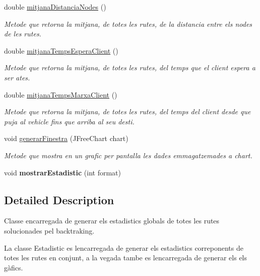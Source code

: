 \begin{DoxyCompactItemize}
double \hyperlink{class_portam_a_pro_p_1_1_estadistics_a81b7957cb875a5e8ac80d2d94c330bde}{mitjana\+Distancia\+Nodes} ()
\begin{DoxyCompactList}\small\item\em Metode que retorna la mitjana, de totes les rutes, de la distancia entre els nodes de les rutes. \end{DoxyCompactList}\item 
double \hyperlink{class_portam_a_pro_p_1_1_estadistics_a1fe702434660a6f2bb9078a7c1e3fc6d}{mitjana\+Temps\+Espera\+Client} ()
\begin{DoxyCompactList}\small\item\em Metode que retorna la mitjana, de totes les rutes, del temps que el client espera a ser ates. \end{DoxyCompactList}\item 
double \hyperlink{class_portam_a_pro_p_1_1_estadistics_a32bdc62dbae367138c84f6cd1331fb9f}{mitjana\+Temps\+Marxa\+Client} ()
\begin{DoxyCompactList}\small\item\em Metode que retorna la mitjana, de totes les rutes, del temps del client desde que puja al vehicle fins que arriba al seu desti. \end{DoxyCompactList}\item 
void \hyperlink{class_portam_a_pro_p_1_1_estadistics_a36584b822106277dc698bc3bfb5baf0b}{generar\+Finestra} (J\+Free\+Chart chart)
\begin{DoxyCompactList}\small\item\em Metode que mostra en un grafic per pantalla les dades emmagatzemades a chart. \end{DoxyCompactList}\item 
\mbox{\label{class_portam_a_pro_p_1_1_estadistics_adafba688de294f32fd12e6d002503fb1}} 
void {\bfseries mostrar\+Estadistic} (int format)
\end{DoxyCompactItemize}


\subsection{Detailed Description}
Classe encarregada de generar els estadistics globals de totes les rutes solucionades pel backtraking. 

La classe Estadistic es l\textquotesingle{}encarregada de generar els estadistics correponents de totes les rutes en conjunt, a la vegada tambe es l\textquotesingle{}encarregada de generar els els gàfics.

